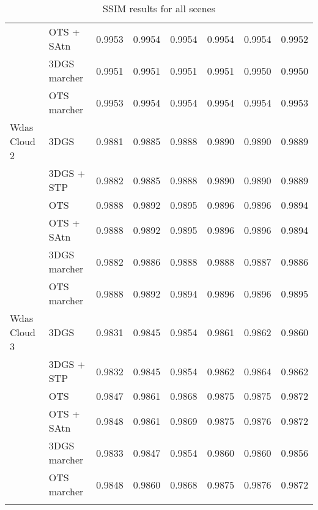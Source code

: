 \begin{longtable}[H]{llrrrrrr}
 & OTS + SAtn & 0.9953 & 0.9954 & 0.9954 & 0.9954 & 0.9954 & 0.9952 \\
 & 3DGS marcher & 0.9951 & 0.9951 & 0.9951 & 0.9951 & 0.9950 & 0.9950 \\
 & OTS marcher & 0.9953 & 0.9954 & 0.9954 & 0.9954 & 0.9954 & 0.9953 \\
Wdas Cloud 2 & 3DGS & 0.9881 & 0.9885 & 0.9888 & 0.9890 & 0.9890 & 0.9889 \\
 & 3DGS + STP & 0.9882 & 0.9885 & 0.9888 & 0.9890 & 0.9890 & 0.9889 \\
 & OTS & 0.9888 & 0.9892 & 0.9895 & 0.9896 & 0.9896 & 0.9894 \\
 & OTS + SAtn & 0.9888 & 0.9892 & 0.9895 & 0.9896 & 0.9896 & 0.9894 \\
 & 3DGS marcher & 0.9882 & 0.9886 & 0.9888 & 0.9888 & 0.9887 & 0.9886 \\
 & OTS marcher & 0.9888 & 0.9892 & 0.9894 & 0.9896 & 0.9896 & 0.9895 \\
Wdas Cloud 3 & 3DGS & 0.9831 & 0.9845 & 0.9854 & 0.9861 & 0.9862 & 0.9860 \\
 & 3DGS + STP & 0.9832 & 0.9845 & 0.9854 & 0.9862 & 0.9864 & 0.9862 \\
 & OTS & 0.9847 & 0.9861 & 0.9868 & 0.9875 & 0.9875 & 0.9872 \\
 & OTS + SAtn & 0.9848 & 0.9861 & 0.9869 & 0.9875 & 0.9876 & 0.9872 \\
 & 3DGS marcher & 0.9833 & 0.9847 & 0.9854 & 0.9860 & 0.9860 & 0.9856 \\
 & OTS marcher & 0.9848 & 0.9860 & 0.9868 & 0.9875 & 0.9876 & 0.9872 \\
\bottomrule
\caption{SSIM results for all scenes}
\end{longtable}
